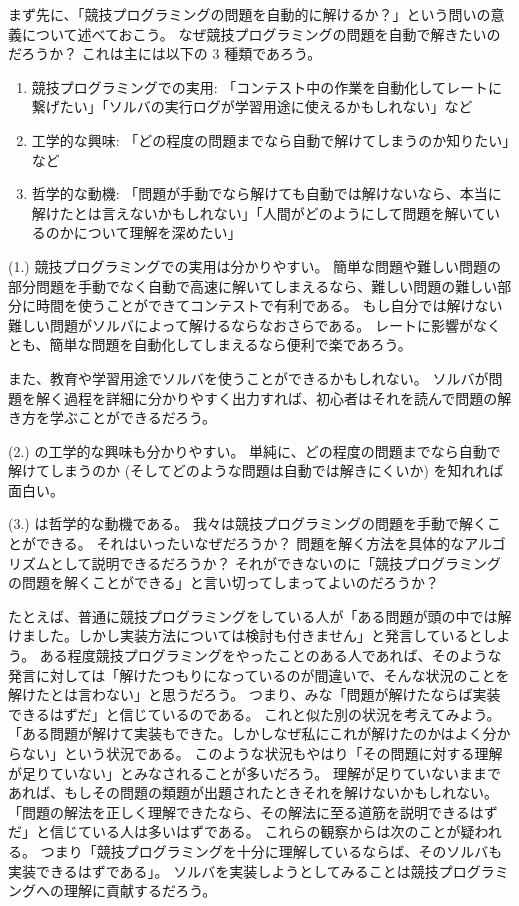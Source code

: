 \documentclass{ltjsarticle}
\begin{document}
まず先に、「競技プログラミングの問題を自動的に解けるか？」という問いの意義について述べておこう。
なぜ競技プログラミングの問題を自動で解きたいのだろうか？
これは主には以下の 3 種類であろう。

\begin{enumerate}[label=(\arabic{enumi}.)]
    \item 競技プログラミングでの実用: 「コンテスト中の作業を自動化してレートに繋げたい」「ソルバの実行ログが学習用途に使えるかもしれない」など
    \item 工学的な興味: 「どの程度の問題までなら自動で解けてしまうのか知りたい」など
    \item 哲学的な動機: 「問題が手動でなら解けても自動では解けないなら、本当に解けたとは言えないかもしれない」「人間がどのようにして問題を解いているのかについて理解を深めたい」
\end{enumerate}

(1.) 競技プログラミングでの実用は分かりやすい。
簡単な問題や難しい問題の部分問題を手動でなく自動で高速に解いてしまえるなら、難しい問題の難しい部分に時間を使うことができてコンテストで有利である。
もし自分では解けない難しい問題がソルバによって解けるならなおさらである。
レートに影響がなくとも、簡単な問題を自動化してしまえるなら便利で楽であろう。

また、教育や学習用途でソルバを使うことができるかもしれない。
ソルバが問題を解く過程を詳細に分かりやすく出力すれば、初心者はそれを読んで問題の解き方を学ぶことができるだろう。

(2.) の工学的な興味も分かりやすい。
単純に、どの程度の問題までなら自動で解けてしまうのか (そしてどのような問題は自動では解きにくいか) を知れれば面白い。

(3.) は哲学的な動機である。
我々は競技プログラミングの問題を手動で解くことができる。
それはいったいなぜだろうか？
問題を解く方法を具体的なアルゴリズムとして説明できるだろうか？
それができないのに「競技プログラミングの問題を解くことができる」と言い切ってしまってよいのだろうか？

たとえば、普通に競技プログラミングをしている人が「ある問題が頭の中では解けました。しかし実装方法については検討も付きません」と発言しているとしよう。
ある程度競技プログラミングをやったことのある人であれば、そのような発言に対しては「解けたつもりになっているのが間違いで、そんな状況のことを解けたとは言わない」と思うだろう。
つまり、みな「問題が解けたならば実装できるはずだ」と信じているのである。
これと似た別の状況を考えてみよう。
「ある問題が解けて実装もできた。しかしなぜ私にこれが解けたのかはよく分からない」という状況である。
このような状況もやはり「その問題に対する理解が足りていない」とみなされることが多いだろう。
理解が足りていないままであれば、もしその問題の類題が出題されたときそれを解けないかもしれない。
「問題の解法を正しく理解できたなら、その解法に至る道筋を説明できるはずだ」と信じている人は多いはずである。
これらの観察からは次のことが疑われる。
つまり「競技プログラミングを十分に理解しているならば、そのソルバも実装できるはずである」。
ソルバを実装しようとしてみることは競技プログラミングへの理解に貢献するだろう。
\end{document}
